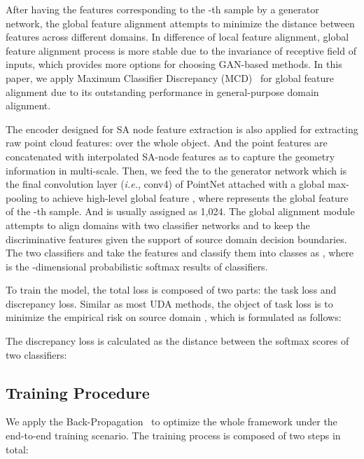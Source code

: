\documentclass{article}
\newcommand*\ie{\textit{i.e.}}
\begin{document}
After having the features  corresponding to the -th sample by a generator network, the global feature alignment attempts to minimize the distance between features across different domains. In difference of local feature alignment, global feature alignment process is more stable due to the invariance of receptive field of inputs, which provides more options for choosing GAN-based methods. In this paper, we apply Maximum Classifier Discrepancy (MCD)~\cite{saito2018maximum} for global feature alignment due to its outstanding performance in general-purpose domain alignment.



The encoder  designed for SA node feature extraction is also applied for extracting raw point cloud features:  over the whole object. And the point features are concatenated with interpolated SA-node features as  to capture the geometry information in multi-scale. Then, we feed the  to the generator network  which is the final convolution layer (\ie, conv4) of PointNet attached with a global max-pooling to achieve high-level global feature  , where  represents the global feature of the -th sample. And  is usually assigned as 1,024. The global alignment module attempts to align domains with two classifier networks  and  to keep the discriminative features given the support of source domain decision boundaries. The two classifiers  and  take the features  and classify them into  classes as , where  is the -dimensional probabilistic softmax results of classifiers.












To train the model, the total loss is composed of two parts: the task loss and discrepancy loss. Similar as most UDA methods, the object of task loss is to minimize the empirical risk on source domain , which is formulated as follows:




The discrepancy loss is calculated as the  distance between the softmax scores of two classifiers:





\subsection{Training Procedure}

We apply the Back-Propagation~\cite{rumelhart1986learning} to optimize the whole framework under the end-to-end training scenario. The training process is composed of two steps in total:
\end{document}
